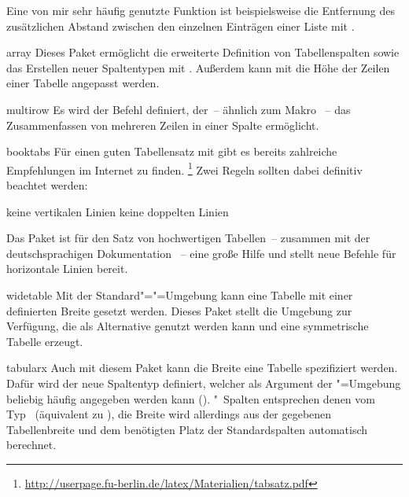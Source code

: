 \documentclass[%
  english,ngerman,%
  headings=optiontoheadandtoc,captions=tableheading,numbers=noenddot,%
  chapterpage,cdfoot,%
]{tudscrman}
\begin{document}
\begin{packages}
  Eine von mir sehr häufig genutzte Funktion ist beispielsweise die Entfernung 
  des zusätzlichen Abstand zwischen den einzelnen Einträgen einer Liste mit 
  .
\item[array]
  Dieses Paket ermöglicht die erweiterte Definition von Tabellenspalten sowie 
  das Erstellen neuer Spaltentypen mit . Außerdem kann mit 
   die Höhe der Zeilen einer Tabelle angepasst werden.
\item[multirow]
  Es wird der Befehl  definiert, der~-- ähnlich zum Makro 
  ~-- das Zusammenfassen von mehreren Zeilen in einer Spalte 
  ermöglicht.
\item[booktabs]
  Für einen guten Tabellensatz mit  gibt es bereits zahlreiche   
  Empfehlungen im Internet zu finden.%
  \footnote{\url{http://userpage.fu-berlin.de/latex/Materialien/tabsatz.pdf}}
  Zwei Regeln sollten dabei definitiv beachtet werden:
  \begin{enumerate}[itemindent=0pt,labelwidth=*,labelsep=1em,label=\Roman*.]
  \makeatletter
  \item@packages keine vertikalen Linien
  \item@packages keine doppelten Linien
  \makeatother
  \end{enumerate}
  Das Paket  ist für den Satz von hochwertigen Tabellen~-- 
  zusammen mit der deutschsprachigen Dokumentation ~-- 
  eine große Hilfe und stellt neue Befehle für horizontale Linien bereit.
\item[widetable]
  Mit der Standard"="=Umgebung  kann eine 
  Tabelle mit einer definierten Breite gesetzt werden. Dieses Paket stellt die 
  Umgebung  zur Verfügung, die als Alternative genutzt 
  werden kann und eine symmetrische Tabelle erzeugt.
\item[tabularx]
  Auch mit diesem Paket kann die Breite eine Tabelle spezifiziert werden. Dafür 
  wird der neue Spaltentyp  definiert, welcher als Argument der 
  "=Umgebung beliebig häufig angegeben werden kann
  (). 
  "~Spalten entsprechen denen vom Typ~
  (äquivalent zu ), die Breite wird allerdings 
  aus der gegebenen Tabellenbreite und dem benötigten Platz der Standardspalten 
  automatisch berechnet.

\end{packages}
\end{document}
